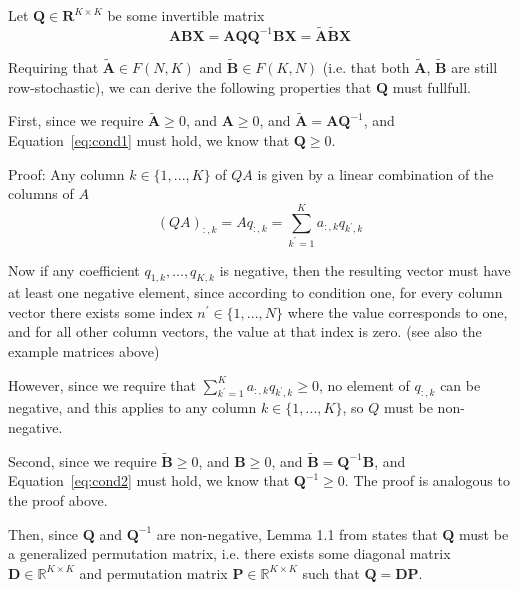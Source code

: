 \documentclass[oneside]{article}
\begin{document}

Let $\mathbf{Q} \in \mathbf{R}^{K \times K}$ be some invertible matrix
\begin{equation}
    \mathbf{A} \mathbf{B} \mathbf{X} = \mathbf{A} \mathbf{Q} \mathbf{Q}^{-1} \mathbf{B} \mathbf{X} = \tilde{\mathbf{A}} \tilde{\mathbf{B}} \mathbf{X}
\end{equation}

Requiring that $\tilde{\mathbf{A}} \in F(N, K)$ and $\tilde{\mathbf{B}} \in F(K, N)$ (i.e. that both $\tilde{\mathbf{A}}$, $\tilde{\mathbf{B}}$ are still row-stochastic), we can derive the following properties that $\mathbf{Q}$ must fullfull.

First, since we require $\tilde{\mathbf{A}} \geq 0$, and $\mathbf{A} \geq 0$, and $\tilde{\mathbf{A}} = \mathbf{A} \mathbf{Q}^{-1}$, and Equation~\eqref{eq:cond1} must hold, we know that $\mathbf{Q} \geq 0$.

Proof: Any column $k \in \{1, ..., K\}$ of $Q A$ is given by a linear combination of the columns of $A$
\begin{equation}
    (Q A)_{:, k} = A q_{:, k} = \sum_{k^\prime = 1}^K a_{:, k} q_{k^\prime, k}
\end{equation}

Now if any coefficient $q_{1, k}, ..., q_{K, k}$ is negative, then the resulting vector must have at least one negative element, since according to condition one, for every column vector there exists some index $n^\prime \in \{1, ..., N\}$ where the value corresponds to one, and for all other column vectors, the value at that index is zero. (see also the example matrices above)

However, since we require that $\sum_{k^\prime = 1}^K a_{:, k} q_{k^\prime, k} \geq 0$, no element of $q_{:, k}$ can be negative, and this applies to any column $k \in \{1, ..., K\}$, so $Q$ must be non-negative.

Second, since we require $\tilde{\mathbf{B}} \geq 0$, and $\mathbf{B} \geq 0$, and $\tilde{\mathbf{B}} = \mathbf{Q}^{-1} \mathbf{B}$, and Equation~\eqref{eq:cond2} must hold, we know that $\mathbf{Q}^{-1} \geq 0$. The proof is analogous to the proof above.

Then, since $\mathbf{Q}$ and $\mathbf{Q}^{-1}$ are non-negative, Lemma 1.1 from \textcite{mincNonnegativeMatrices1988} states that $\mathbf{Q}$ must be a generalized permutation matrix, i.e. there exists some diagonal matrix $\mathbf{D} \in \mathbb{R}^{K \times K}$ and permutation matrix $\mathbf{P} \in \mathbb{R}^{K \times K}$ such that $\mathbf{Q} = \mathbf{D} \mathbf{P}$.
\end{document}
